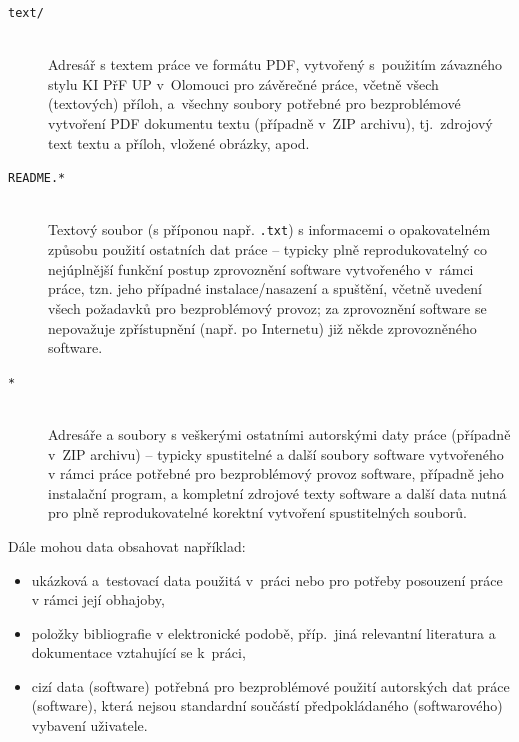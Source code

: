 \documentclass[
  program=itk,
  biblatex,
  figures=false,
  glossaries,
  index
]{kidiplom}
\begin{document}
\begin{description}

\item[\texttt{text/}] \hfill \\
  Adresář s textem práce ve formátu PDF, vytvořený s~použitím
  závazného stylu KI PřF UP v~Olomouci pro závěrečné práce, včetně
  všech (textových) příloh, a~všechny soubory potřebné pro
  bezproblémové vytvoření PDF dokumentu textu (případně v~ZIP
  archivu), tj.~zdrojový text textu a příloh, vložené obrázky, apod.

\item[\texttt{README.*}] \hfill \\
  Textový soubor (s příponou např. \texttt{.txt}) s informacemi o
  opakovatelném způsobu použití ostatních dat práce -- typicky plně
  reprodukovatelný co nejúplnější funkční postup zprovoznění software
  vytvořeného v~rámci práce, tzn. jeho případné instalace/nasazení a
  spuštění, včetně uvedení všech požadavků pro bezproblémový provoz;
  za zprovoznění software se nepovažuje zpřístupnění (např. po
  Internetu) již někde zprovozněného software.

\item[\texttt{*}] \hfill \\
  Adresáře a soubory s veškerými ostatními autorskými daty práce
  (případně v~ZIP archivu) -- typicky spustitelné a další soubory
  software vytvořeného v rámci práce potřebné pro bezproblémový provoz
  software, případně jeho instalační program, a kompletní zdrojové
  texty software a další data nutná pro plně reprodukovatelné korektní
  vytvoření spustitelných souborů.

\end{description}

Dále mohou data obsahovat například:

\begin{itemize}

\item
  ukázková a~testovací data použitá v~práci nebo pro potřeby posouzení
  práce v rámci její obhajoby,

\item
  položky bibliografie v elektronické podobě, příp.~jiná relevantní literatura
  a dokumentace vztahující se k~práci,

\item
  cizí data (software) potřebná pro bezproblémové použití autorských
  dat práce (software), která nejsou standardní součástí
  předpokládaného (softwarového) vybavení uživatele.

\end{itemize}
\end{document}
